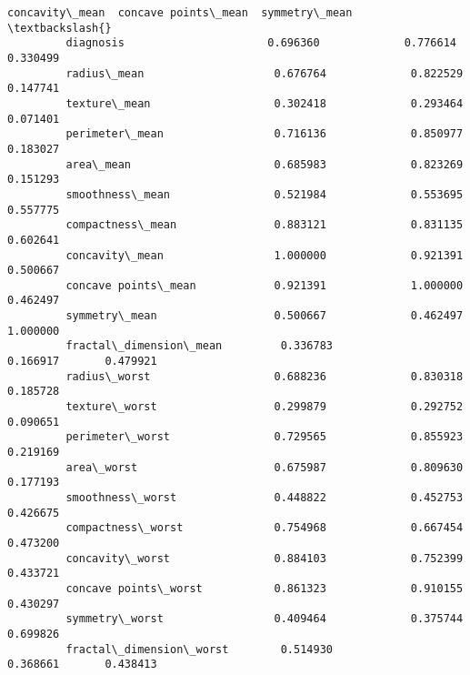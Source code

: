 \documentclass[11pt]{article}
\begin{document}
\begin{Verbatim}[commandchars=\\\{\}]
                                  concavity\_mean  concave points\_mean  symmetry\_mean  \textbackslash{}
         diagnosis                      0.696360             0.776614       0.330499   
         radius\_mean                    0.676764             0.822529       0.147741   
         texture\_mean                   0.302418             0.293464       0.071401   
         perimeter\_mean                 0.716136             0.850977       0.183027   
         area\_mean                      0.685983             0.823269       0.151293   
         smoothness\_mean                0.521984             0.553695       0.557775   
         compactness\_mean               0.883121             0.831135       0.602641   
         concavity\_mean                 1.000000             0.921391       0.500667   
         concave points\_mean            0.921391             1.000000       0.462497   
         symmetry\_mean                  0.500667             0.462497       1.000000   
         fractal\_dimension\_mean         0.336783             0.166917       0.479921   
         radius\_worst                   0.688236             0.830318       0.185728   
         texture\_worst                  0.299879             0.292752       0.090651   
         perimeter\_worst                0.729565             0.855923       0.219169   
         area\_worst                     0.675987             0.809630       0.177193   
         smoothness\_worst               0.448822             0.452753       0.426675   
         compactness\_worst              0.754968             0.667454       0.473200   
         concavity\_worst                0.884103             0.752399       0.433721   
         concave points\_worst           0.861323             0.910155       0.430297   
         symmetry\_worst                 0.409464             0.375744       0.699826   
         fractal\_dimension\_worst        0.514930             0.368661       0.438413   
         

\end{Verbatim}
\end{document}
